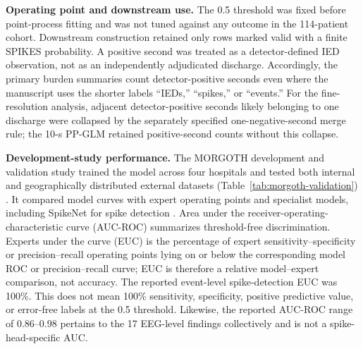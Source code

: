 \documentclass[11pt]{article}
\begin{document}
\textbf{Operating point and downstream use.} The 0.5 threshold was fixed before point-process fitting and was not tuned against any outcome in the 114-patient cohort. Downstream construction retained only rows marked valid with a finite SPIKES probability. A positive second was treated as a detector-defined IED observation, not as an independently adjudicated discharge. Accordingly, the primary burden summaries count detector-positive seconds even where the manuscript uses the shorter labels ``IEDs,'' ``spikes,'' or ``events.'' For the fine-resolution analysis, adjacent detector-positive seconds likely belonging to one discharge were collapsed by the separately specified one-negative-second merge rule; the 10-s PP-GLM retained positive-second counts without this collapse.

\textbf{Development-study performance.} The MORGOTH development and validation study trained the model across four hospitals and tested both internal and geographically distributed external datasets (Table~\ref{tab:morgoth-validation}) \cite{MORGOTHValidation2026}. It compared model curves with expert operating points and specialist models, including SpikeNet for spike detection \cite{Jing2020}. Area under the receiver-operating-characteristic curve (AUC-ROC) summarizes threshold-free discrimination. Experts under the curve (EUC) is the percentage of expert sensitivity--specificity or precision--recall operating points lying on or below the corresponding model ROC or precision--recall curve; EUC is therefore a relative model--expert comparison, not accuracy. The reported event-level spike-detection EUC was 100\%. This does not mean 100\% sensitivity, specificity, positive predictive value, or error-free labels at the 0.5 threshold. Likewise, the reported AUC-ROC range of 0.86--0.98 pertains to the 17 EEG-level findings collectively and is not a spike-head-specific AUC.
\end{document}
